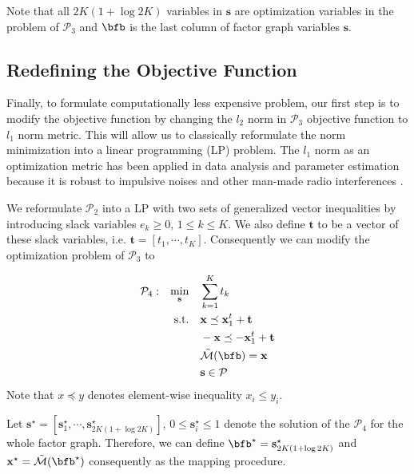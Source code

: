 Note that all $2K (1 + \log 2K)$ variables in $\mathbf{s}$ are optimization variables in the problem of $\mathcal{P}_3$ and
$\bfb$ is the last column of factor graph variables $\mathbf{s}$. 





\subsection{Redefining the Objective Function}
Finally, to formulate computationally less expensive problem, our first step is to modify 
the objective function by changing the $l_2$ norm
 in $\mathcal{P}_3$ objective function 
to $l_1$ norm metric. This will allow us to classically reformulate the norm minimization
into a linear programming (LP) problem. The $l_1$ norm as an optimization
metric has been applied in 
data analysis and parameter estimation because it is robust 
to impulsive noises and other man-made radio
interferences \cite{cui2006linear}. 



We reformulate $\mathcal{P}_2$ into a LP with
two sets of generalized vector inequalities by introducing slack variables $e_k\ge 0,\, 1 \leq k \leq K$. 
We also define $\mathbf{t}$ to be a vector of these slack variables, i.e. $\mathbf{t} = [t_1, \cdots, t_K]$. Consequently we can modify the optimization problem of $\mathcal{P}_3$ to




\begin{equation}
\begin{aligned}
\label{MILP}
\mathcal{P}_4: \quad &\underset{\mathbf{s}} {\text{min}} && \sum_{k=1}^{K} t_k \\
				 &\text{  s.t.}  && \mathbf{x} \preceq  \mathbf{x}_1^t + \mathbf{t}\\
				                  & &&-\mathbf{x} \preceq  -\mathbf{x}_1^t + \mathbf{t}\\
				                  &&&\cal{\tilde{M}}(\bfb) = \mathbf{x}\\
						 &&& \mathbf{s} \in \mathcal{P}\\
\end{aligned}
\end{equation}
Note that $x \preceq y$ denotes element-wise inequality $x_i \leq y_i$. 

Let $\mathbf{s}^\star = [\mathbf{s}^\star_1, \cdots, \mathbf{s}^\star_{2K(1+\log 2K)}]$, $0 \leq \mathbf{s}^\star_i \leq 1 $ denote the solution of the
$\mathcal{P}_4$ for the whole factor graph. Therefore, we can define $\bfb^\star= \mathbf{s}^\star_{2K(1+\log 2K)} $ and $\mathbf{x}^\star = \cal{\tilde{M}}(\bfb^\star) $
consequently as the mapping procedure.




